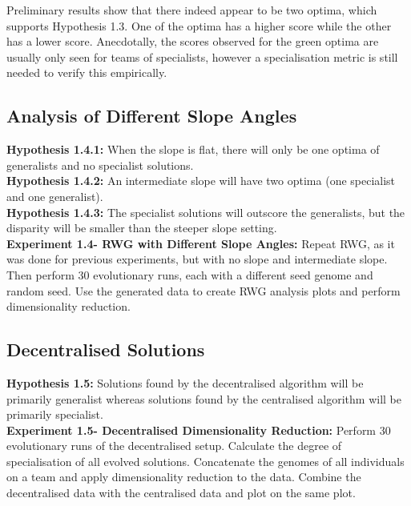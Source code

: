 \documentclass[12pt]{article}
\begin{document}
Preliminary results show that there indeed appear to be two optima, which supports Hypothesis 1.3.
One of the optima has a higher score while the other has a lower score.
Anecdotally, the scores observed for the green optima are usually only seen for teams of specialists, however a specialisation metric is still needed to verify this empirically.\\

\subsection{Analysis of Different Slope Angles}

\textbf{Hypothesis 1.4.1:} When the slope is flat, there will only be one optima of generalists and no specialist solutions.\\

\textbf{Hypothesis 1.4.2:} An intermediate slope will have two optima (one specialist and one generalist).\\

\textbf{Hypothesis 1.4.3:} The specialist solutions will outscore the generalists, but the disparity will be smaller than the steeper slope setting. \\

\textbf{Experiment 1.4- RWG with Different Slope Angles:} Repeat RWG, as it was done for previous experiments, but with no slope and intermediate slope.
Then perform 30 evolutionary runs, each with a different seed genome and random seed.
Use the generated data to create RWG analysis plots and perform dimensionality reduction.\\

\subsection{Decentralised Solutions} 

\textbf{Hypothesis 1.5:} Solutions found by the decentralised algorithm will be primarily generalist whereas solutions found by the centralised algorithm will be primarily specialist.\\

\textbf{Experiment 1.5- Decentralised Dimensionality Reduction:} Perform 30 evolutionary runs of the decentralised setup.
Calculate the degree of specialisation of all evolved solutions.
Concatenate the genomes of all individuals on a team and apply dimensionality reduction to the data.
Combine the decentralised data with the centralised data and plot on the same plot.\\
\end{document}
